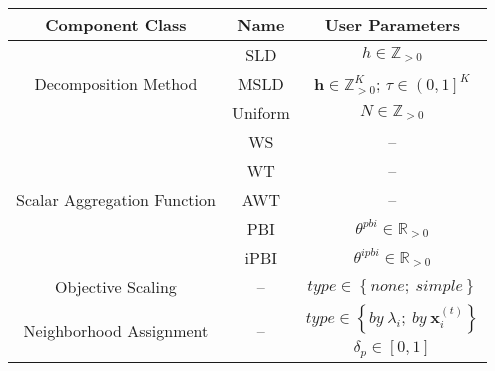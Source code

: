 
\renewcommand{\arraystretch}{1.4}

  \begin{tabular}{|c|c|c|}
    \hline
    \textbf{Component Class} & \textbf{Name} & \textbf{User Parameters} \\
    \hline
    \multirow{3}{*}{Decomposition Method}& 
	SLD & $h\in\mathbb{Z}_{>0}$\\
	\cline{2-3}
    & MSLD & $\mathbf{h}\in\mathbb{Z}^{K}_{>0}$; $\tau\in\left(0,1\right]^{K}$\\
    \cline{2-3}
    & Uniform& $N\in\mathbb{Z}_{>0}$\\
    \hline
    \multirow{5}{*}{Scalar Aggregation Function}& 
    WS& -- \\
    \cline{2-3}
    & WT& -- \\
    \cline{2-3}
    & AWT& -- \\
    \cline{2-3}
    & PBI& $\theta^{pbi}\in\mathbb{R}_{>0}$ \\
    \cline{2-3}
    & iPBI& $\theta^{ipbi}\in\mathbb{R}_{>0}$ \\
    \hline
Objective Scaling& 
	-- & $type\in\left\{none;~simple\right\}$ \\
    \hline
\multirow{2}{*}{Neighborhood Assignment}& 
	\multirow{2}{*}{--} & $type\in\left\{by~\lambda_i;~by~\mathbf{x}_i^{(t)} \right\}$ \\
	\cline{3-3}
	& & $\delta_p\in\left[0,1\right]$ \\
        \hline
        
    \end{tabular} 
